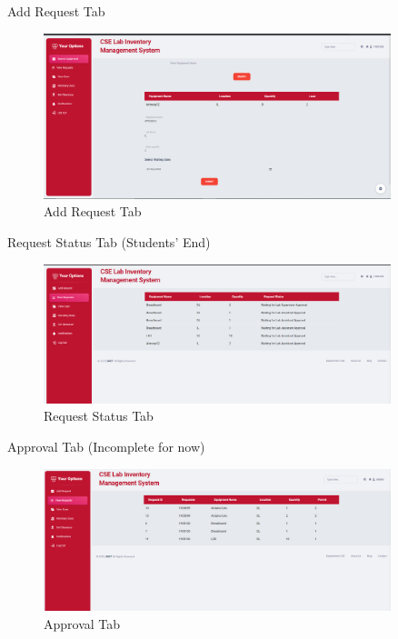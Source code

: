 \documentclass[20pt]{beamer}
\numberwithin{figure}{section}
\begin{document}
\begin{frame}{Add Request Tab}

     \begin{figure}
        \centering
        \includegraphics[width= 0.9\textwidth , height= 0.3\paperheight]{AddRequest.png}
        \caption{Add Request Tab}
        \label{fig:46}
    \end{figure}

\end{frame}

\begin{frame}{Request Status Tab (Students' End)}

     \begin{figure}
        \centering
        \includegraphics[width= 0.9\textwidth , height= 0.3\paperheight]{ViewRequestStatus.png}
        \caption{Request Status Tab}
        \label{fig:47}
    \end{figure}

\end{frame}

\begin{frame}{Approval Tab (Incomplete for now)}

     \begin{figure}
        \centering
        \includegraphics[width= 0.9\textwidth , height= 0.3\paperheight]{Approval.png}
        \caption{Approval Tab}
        \label{fig:48}
    \end{figure}

\end{frame}
\end{document}
